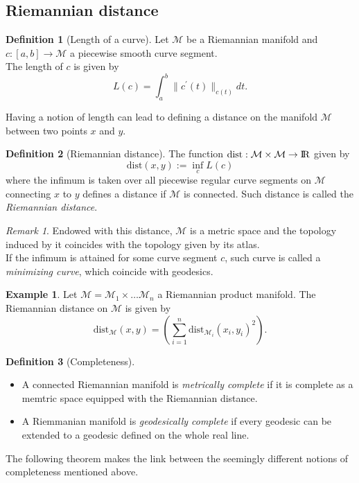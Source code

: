 \documentclass[10pt,a4paper]{book}
\theoremstyle{definition}
\newtheorem{defn}{Definition}[section]
\newtheorem{exm}{Example}[section]
\theoremstyle{plain}
\theoremstyle{remark}
\newtheorem{rmk}{Remark}[section]
\newcommand \M {\mathcal{M}}
\def\R{{\rm I\kern-0.16em R}}
\begin{document}
\subsection{Riemannian distance}

\begin{defn}[Length of a curve]
Let $\M$ be a Riemannian manifold and $c:[a,b]\to \M$ a piecewise smooth curve segment.\\
The length of $c$ is given by
$$L(c)=\int_a^{b}\|c^{\prime}(t)\|_{c(t)}dt.$$
\end{defn}
Having a notion of length can lead to defining a distance on the manifold $\M$ between two points $x$ and $y$.
\begin{defn}[Riemannian distance]
The function $\text{dist}:\M\times \M \to \R$ given by
$$\text{dist}(x,y):=\inf_{c}L(c)$$
where the infimum is taken over all piecewise regular curve segments on $\M$ connecting $x$ to $y$ defines a distance if $\M$ is connected. Such distance is called the \emph{Riemannian distance}. 
\end{defn}
\begin{rmk}
Endowed with this distance, $\M$ is a metric space and the topology induced by it coincides with the topology given by its atlas.\\ If the infimum is attained for some curve segment $c$, such curve is called a \emph{minimizing curve}, which coincide with geodesics.
\end{rmk}
\begin{exm}
Let $\M=\M_1\times \dots \M_n$ a Riemannian product manifold. The Riemannian distance on $\M$ is given by
$$\text{dist}_{\M}(x,y)=\left(\sum_{i=1}^{n}\text{dist}_{\M_i}(x_i,y_i)^2\right).$$
\end{exm}
\begin{defn}[Completeness]~
\begin{itemize}
\item A connected Riemannian manifold is \emph{metrically complete} if it is complete as a memtric space equipped with the Riemannian distance.
\item A Riemmanian manifold is \emph{geodesically complete} if every geodesic can be extended to a geodesic defined on the whole real line. 
\end{itemize}
\end{defn}
The following theorem makes the link between the seemingly different notions of completeness mentioned above.
\end{document}
